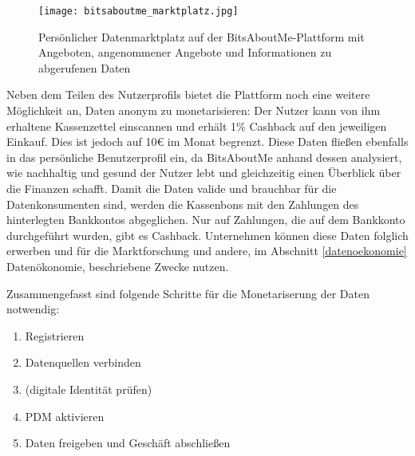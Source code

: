 \begin{figure}[!ht]
	\centering
	\texttt{[image: bitsaboutme\_marktplatz.jpg]}
	\caption{Persönlicher Datenmarktplatz auf der BitsAboutMe-Plattform mit Angeboten, angenommener Angebote und Informationen zu abgerufenen Daten}
	\label{fig:bitsaboutmeMarktplatz}
\end{figure}
\FloatBarrier

\noindent Neben dem Teilen des Nutzerprofils bietet die Plattform noch eine weitere Möglichkeit an, Daten anonym zu monetarisieren: Der Nutzer kann von ihm erhaltene Kassenzettel einscannen und erhält 1\% Cashback auf den jeweiligen Einkauf. Dies ist jedoch auf 10€ im Monat begrenzt. Diese Daten fließen ebenfalls in das persönliche Benutzerprofil ein, da BitsAboutMe anhand dessen analysiert, wie nachhaltig und gesund der Nutzer lebt und gleichzeitig einen Überblick über die Finanzen schafft. Damit die Daten valide und brauchbar für die Datenkonsumenten sind, werden die Kassenbons mit den Zahlungen des hinterlegten Bankkontos abgeglichen. Nur auf Zahlungen, die auf dem Bankkonto durchgeführt wurden, gibt es Cashback. Unternehmen können diese Daten folglich erwerben und für die Marktforschung und andere, im Abschnitt \ref{datenoekonomie} Datenökonomie, beschriebene Zwecke nutzen. \newline

\noindent Zusammengefasst sind folgende Schritte für die Monetariserung der Daten notwendig:
\begin{enumerate}
	\item Registrieren
	\item Datenquellen verbinden
	\item (digitale Identität prüfen)
	\item PDM aktivieren
	\item Daten freigeben und Geschäft abschließen
\end{enumerate}